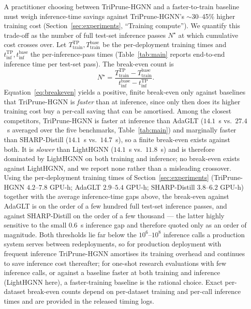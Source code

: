 \documentclass[10pt]{article}
\theoremstyle{plain}
\theoremstyle{definition}
\begin{document}
A practitioner choosing between TriPrune-HGNN and a faster-to-train baseline must weigh inference-time savings against TriPrune-HGNN's $\sim$30--45\% higher training cost (Section~\ref{sec:experiments}, ``Training compute''). We quantify this trade-off as the number of full test-set inference passes $N^{\star}$ at which cumulative cost crosses over. Let $T_{\mathrm{train}}^{\mathrm{TP}}, T_{\mathrm{train}}^{\mathrm{base}}$ be the per-deployment training times and $t_{\mathrm{inf}}^{\mathrm{TP}}, t_{\mathrm{inf}}^{\mathrm{base}}$ the per-inference-pass times (Table~\ref{tab:main} reports end-to-end inference time per test-set pass). The break-even count is
\begin{equation}
N^{\star} = \frac{T_{\mathrm{train}}^{\mathrm{TP}} - T_{\mathrm{train}}^{\mathrm{base}}}{t_{\mathrm{inf}}^{\mathrm{base}} - t_{\mathrm{inf}}^{\mathrm{TP}}}.
\label{eq:breakeven}
\end{equation}
Equation~\eqref{eq:breakeven} yields a positive, finite break-even only against baselines that TriPrune-HGNN is \emph{faster} than at inference, since only then does its higher training cost buy a per-call saving that can be amortised. Among the closest competitors, TriPrune-HGNN is faster at inference than AdaGLT ($14.1$~s vs.\ $27.4$~s averaged over the five benchmarks, Table~\ref{tab:main}) and marginally faster than SHARP-Distill ($14.1$~s vs.\ $14.7$~s), so a finite break-even exists against both. It is \emph{slower} than LightHGNN ($14.1$~s vs.\ $11.8$~s) and is therefore dominated by LightHGNN on both training and inference; no break-even exists against LightHGNN, and we report none rather than a misleading crossover. Using the per-deployment training times of Section~\ref{sec:experiments} (TriPrune-HGNN $4.2$--$7.8$ GPU-h; AdaGLT $2.9$--$5.4$ GPU-h; SHARP-Distill $3.8$--$6.2$ GPU-h) together with the average inference-time gaps above, the break-even against AdaGLT is on the order of a few hundred full test-set inference passes, and against SHARP-Distill on the order of a few thousand --- the latter highly sensitive to the small $0.6$~s inference gap and therefore quoted only as an order of magnitude. Both thresholds lie far below the $10^{6}$--$10^{8}$ inference calls a production system serves between redeployments, so for production deployment with frequent inference TriPrune-HGNN amortises its training overhead and continues to save inference cost thereafter; for one-shot research evaluations with few inference calls, or against a baseline faster at both training and inference (LightHGNN here), a faster-training baseline is the rational choice. Exact per-dataset break-even counts depend on per-dataset training and per-call inference times and are provided in the released timing logs.
\end{document}
